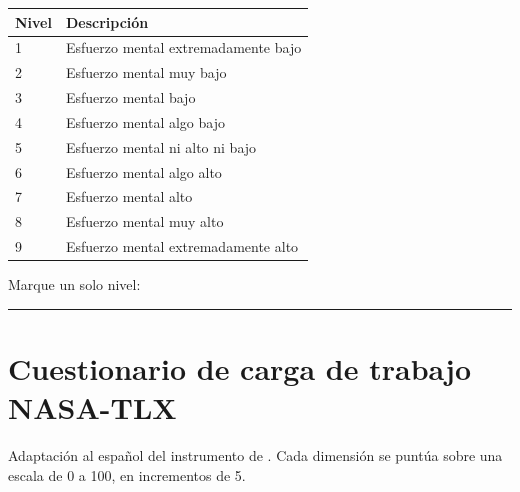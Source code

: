\documentclass[12pt,a4paper,openany]{report}
\begin{document}
    \vspace{10pt}
    \begin{table}[htbp]
        \centering
        \small
        \begin{tabular}{C{1.1cm} L{11.5cm}}
            \toprule
            \textbf{Nivel} & \textbf{Descripci\'on} \\
             & Esfuerzo mental extremadamente bajo \\
            2 & Esfuerzo mental muy bajo \\
            3 & Esfuerzo mental bajo \\
            4 & Esfuerzo mental algo bajo \\
            5 & Esfuerzo mental ni alto ni bajo \\
            6 & Esfuerzo mental algo alto \\
            7 & Esfuerzo mental alto \\
            8 & Esfuerzo mental muy alto \\
            9 & Esfuerzo mental extremadamente alto \\
            \bottomrule
        \end{tabular}
    \end{table}
    
    Marque un solo nivel: \rule{2.0cm}{0.4pt}
    
    \chapter{Cuestionario de carga de trabajo NASA-TLX}
    \label{anx:tlx}
    
    Adaptaci\'on al espa\~nol del instrumento de \citet{hart1988development}. Cada dimensi\'on se punt\'ua sobre una escala de 0 a 100, en incrementos de 5.
    
\end{document}
